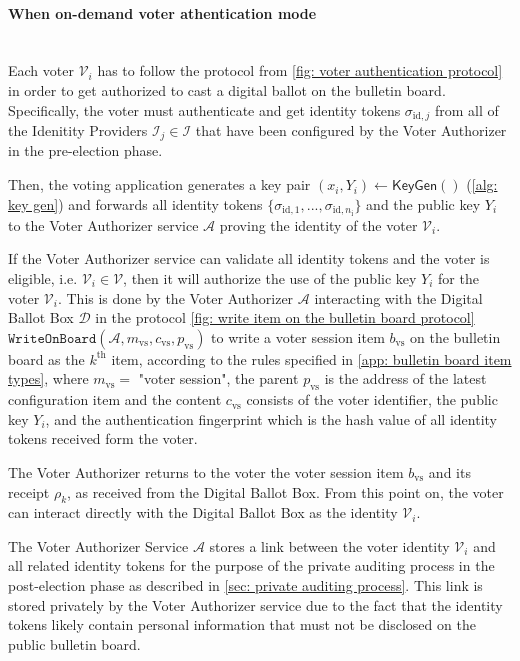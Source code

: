 \paragraph{When on-demand voter athentication mode}\mbox{}\\
Each voter $\mathcal{V}_i$ has to follow the protocol from \cref{fig: voter authentication protocol} in order to get authorized to cast a digital ballot on the bulletin board. Specifically, the voter must authenticate and get identity tokens $\sigma_{\mathrm{id}, j}$ from all of the Idenitity Providers $\mathcal{I}_j \in \boldsymbol{\mathcal{I}}$ that have been configured by the Voter Authorizer in the pre-election phase.

Then, the voting application generates a key pair $(x_i, Y_i) \gets \mathsf{KeyGen}()$ (\cref{alg: key gen}) and forwards all identity tokens $\{ \sigma_{\mathrm{id}, 1}, ..., \sigma_{\mathrm{id}, n_\mathrm{i}} \}$ and the public key $Y_i$ to the Voter Authorizer service $\mathcal{A}$ proving the identity of the voter $\mathcal{V}_i$.

If the Voter Authorizer service can validate all identity tokens and the voter is eligible, i.e. $\mathcal{V}_i \in \boldsymbol{\mathcal{V}}$, then it will authorize the use of the public key $Y_i$ for the voter $\mathcal{V}_i$. This is done by the Voter Authorizer $\mathcal{A}$ interacting with the Digital Ballot Box $\mathcal{D}$ in the protocol \ref{fig: write item on the bulletin board protocol} $\mathtt{WriteOnBoard}(\mathcal{A}, m_\mathrm{vs}, c_\mathrm{vs}, p_\mathrm{vs})$ to write a voter session item $b_\mathrm{vs}$ on the bulletin board as the $k^\mathrm{th}$ item, according to the rules specified in \cref{app: bulletin board item types}, where $m_\mathrm{vs} =$ "voter session", the parent $p_\mathrm{vs}$ is the address of the latest configuration item and the content $c_\mathrm{vs}$ consists of the voter identifier, the public key $Y_i$, and the authentication fingerprint which is the hash value of all identity tokens received form the voter. 

The Voter Authorizer returns to the voter the voter session item $b_\mathrm{vs}$ and its receipt $\rho_k$, as received from the Digital Ballot Box. From this point on, the voter can interact directly with the Digital Ballot Box as the identity $\mathcal{V}_i$.

The Voter Authorizer Service $\mathcal{A}$ stores a link between the voter identity $\mathcal{V}_i$ and all related identity tokens for the purpose of the private auditing process in the post-election phase as described in \cref{sec: private auditing process}. This link is stored privately by the Voter Authorizer service due to the fact that the identity tokens likely contain personal information that must not be disclosed on the public bulletin board.

